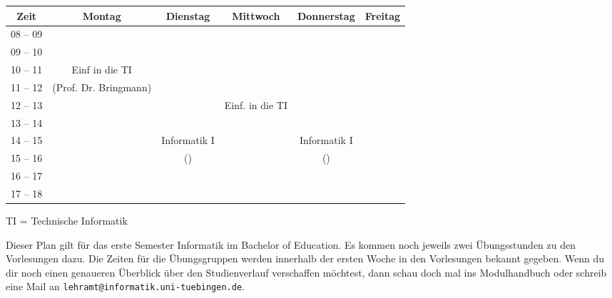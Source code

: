 \begin{minipage}{\textwidth}
    \footnotesize
\begin{center}
	\begin{tabular}{|c|c|c|c|c|c|}
	\hline
	 Zeit     &    Montag                    & Dienstag          & Mittwoch          & Donnerstag & Freitag \\ \hline\hline
	 08 -- 09 &                              &                   &                   &  &  \\ \hline
	 09 -- 10 &                              &                   &                   &  &  \\ \hline
	 10 -- 11 &    Einf in die TI        &                   &                   &  &  \\ \cline{1-1} \cline{3-6} 
	 11 -- 12 &    (Prof. Dr. Bringmann)          &                   &                   &  &  \\ \hline
	 12 -- 13 &                              &                   & Einf. in die TI   &  &  \\ \hline
	 13 -- 14 &                              &                   &                   &  &  \\ \hline
	 14 -- 15 &                              & Informatik I      &                   & Informatik I  &  \\ \cline{1-2} \cline{4-6} 
	 15 -- 16 &                              & (\Infoprof)  &                   &  (\Infoprof)&  \\ \hline
	 16 -- 17 &                              &                   &                   &  &  \\ \hline
	 17 -- 18 &                              &                   &                   &  &  \\ \hline
	\end{tabular}
	
	\scriptsize TI = Technische Informatik
	
\end{center}
\end{minipage}

Dieser Plan gilt für das erste Semester Informatik im Bachelor of Education. Es kommen noch jeweils zwei Übungsstunden zu den Vorlesungen dazu.
Die Zeiten für die Übungsgruppen werden innerhalb der ersten Woche in den Vorlesungen bekannt gegeben. Wenn du dir noch einen genaueren Überblick über den Studienverlauf verschaffen möchtest, dann schau doch mal ins Modulhandbuch oder schreib eine Mail an \texttt{lehramt@informatik.uni-tuebingen.de}.

